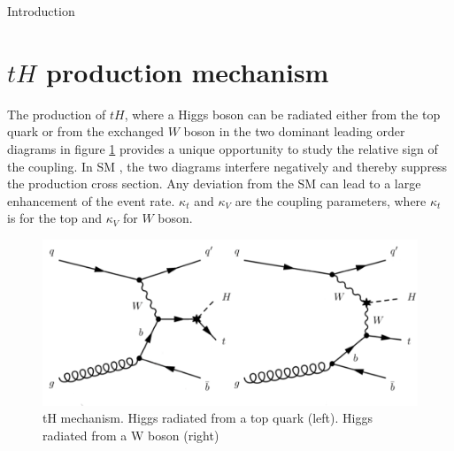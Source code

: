 \begin{chapter}{Introduction}
\section{$tH$ production mechanism}
The production of $tH$, where a Higgs boson can be radiated
either from the top quark or from the exchanged $W$ boson in the two dominant leading order
diagrams in figure \ref{newth} provides a unique opportunity to study the relative sign of the coupling.
In SM , the two diagrams interfere negatively and thereby suppress the production cross section.
Any deviation from the SM can lead to a large enhancement of the event rate.
 $\kappa_t$ and $\kappa_V$ are the coupling parameters, where $\kappa_t$ is for the top and $\kappa_V$ for $W$ boson. \\

\begin{figure}[ht]
	\centering
	\includegraphics[scale=0.5]{Chapter1/newtHq.png}
	\caption{tH mechanism. Higgs radiated from a top quark (left). Higgs radiated from a W boson (right) \protect \cite{bb}} \label{newth}
\end{figure}
\pagebreak



\end{chapter}













